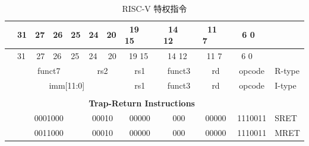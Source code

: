 \documentclass{../runikraft-report}
\begin{document}
{
    \small
    \newcommand{\instbit}[1]{\mbox{\scriptsize #1}}
    \newcommand{\instbitrange}[2]{~\instbit{#1} \hfill \instbit{#2}~}

    \begin{longtable}{p{0in}p{0.4in}p{0.05in}p{0.05in}p{0.05in}p{0.05in}p{0.4in}p{0.6in}p{0.4in}p{0.6in}p{0.7in}l}
    \caption{RISC-V 特权指令}\\
    &
    \multicolumn{1}{l}{\instbit{31}} &
    \multicolumn{1}{r}{\instbit{27}} &
    \instbit{26} &
    \instbit{25} &
    \multicolumn{1}{l}{\instbit{24}} &
    \multicolumn{1}{r}{\instbit{20}} &
    \instbitrange{19}{15} &
    \instbitrange{14}{12} &
    \instbitrange{11}{7} &
    \instbitrange{6}{0} \\
    \cline{2-11}
    \endfirsthead
    &
    \multicolumn{1}{l}{\instbit{31}} &
    \multicolumn{1}{r}{\instbit{27}} &
    \instbit{26} &
    \instbit{25} &
    \multicolumn{1}{l}{\instbit{24}} &
    \multicolumn{1}{r}{\instbit{20}} &
    \instbitrange{19}{15} &
    \instbitrange{14}{12} &
    \instbitrange{11}{7} &
    \instbitrange{6}{0} \\
    \cline{2-11}
    \endhead

    &
    \multicolumn{4}{|c|}{funct7} &
    \multicolumn{2}{c|}{rs2} &
    \multicolumn{1}{c|}{rs1} &
    \multicolumn{1}{c|}{funct3} &
    \multicolumn{1}{c|}{rd} &
    \multicolumn{1}{c|}{opcode} & R-type \\
    \cline{2-11}


    &
    \multicolumn{6}{|c|}{imm[11:0]} &
    \multicolumn{1}{c|}{rs1} &
    \multicolumn{1}{c|}{funct3} &
    \multicolumn{1}{c|}{rd} &
    \multicolumn{1}{c|}{opcode} & I-type \\
    \cline{2-11}


    &
    \multicolumn{10}{c}{} & \\
    &
    \multicolumn{10}{c}{\bf Trap-Return Instructions} & \\
    \cline{2-11}


    &
    \multicolumn{4}{|c|}{0001000} &
    \multicolumn{2}{c|}{00010} &
    \multicolumn{1}{c|}{00000} &
    \multicolumn{1}{c|}{000} &
    \multicolumn{1}{c|}{00000} &
    \multicolumn{1}{c|}{1110011} & SRET \\
    \cline{2-11}


    &
    \multicolumn{4}{|c|}{0011000} &
    \multicolumn{2}{c|}{00010} &
    \multicolumn{1}{c|}{00000} &
    \multicolumn{1}{c|}{000} &
    \multicolumn{1}{c|}{00000} &
    \multicolumn{1}{c|}{1110011} & MRET \\
    \cline{2-11}



\end{longtable}}
\end{document}
